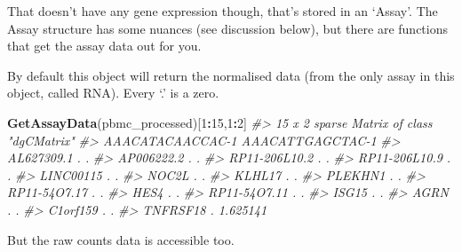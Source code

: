 \documentclass[
]{book}
\newenvironment{Shaded}{\begin{snugshade}}{\end{snugshade}}
\newcommand{\CommentTok}[1]{\textcolor[rgb]{0.56,0.35,0.01}{\textit{#1}}}
\newcommand{\DecValTok}[1]{\textcolor[rgb]{0.00,0.00,0.81}{#1}}
\newcommand{\FunctionTok}[1]{\textcolor[rgb]{0.13,0.29,0.53}{\textbf{#1}}}
\newcommand{\NormalTok}[1]{#1}
\newcommand{\SpecialCharTok}[1]{\textcolor[rgb]{0.81,0.36,0.00}{\textbf{#1}}}
\begin{document}
That doesn't have any gene expression though, that's stored in an `Assay'.
The Assay structure has some nuances (see discussion below), but there are functions that get the assay data out for you.

By default this object will return the normalised data (from the only assay in this object, called RNA). Every `.' is a zero.

\begin{Shaded}
\begin{Highlighting}[]
\FunctionTok{GetAssayData}\NormalTok{(pbmc\_processed)[}\DecValTok{1}\SpecialCharTok{:}\DecValTok{15}\NormalTok{,}\DecValTok{1}\SpecialCharTok{:}\DecValTok{2}\NormalTok{]}
\CommentTok{\#\textgreater{} 15 x 2 sparse Matrix of class "dgCMatrix"}
\CommentTok{\#\textgreater{}               AAACATACAACCAC{-}1 AAACATTGAGCTAC{-}1}
\CommentTok{\#\textgreater{} AL627309.1                   .         .       }
\CommentTok{\#\textgreater{} AP006222.2                   .         .       }
\CommentTok{\#\textgreater{} RP11{-}206L10.2                .         .       }
\CommentTok{\#\textgreater{} RP11{-}206L10.9                .         .       }
\CommentTok{\#\textgreater{} LINC00115                    .         .       }
\CommentTok{\#\textgreater{} NOC2L                        .         .       }
\CommentTok{\#\textgreater{} KLHL17                       .         .       }
\CommentTok{\#\textgreater{} PLEKHN1                      .         .       }
\CommentTok{\#\textgreater{} RP11{-}54O7.17                 .         .       }
\CommentTok{\#\textgreater{} HES4                         .         .       }
\CommentTok{\#\textgreater{} RP11{-}54O7.11                 .         .       }
\CommentTok{\#\textgreater{} ISG15                        .         .       }
\CommentTok{\#\textgreater{} AGRN                         .         .       }
\CommentTok{\#\textgreater{} C1orf159                     .         .       }
\CommentTok{\#\textgreater{} TNFRSF18                     .         1.625141}
\end{Highlighting}
\end{Shaded}

But the raw counts data is accessible too.
\end{document}
